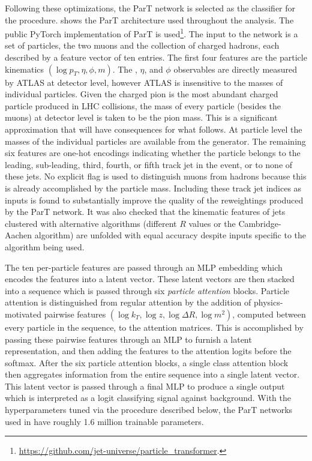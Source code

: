 Following these optimizations, the ParT network is selected as the classifier for the \Omnifold procedure.
 shows the ParT architecture used throughout the analysis.
The public PyTorch implementation of ParT is used\footnote{\url{https://github.com/jet-universe/particle_transformer}.}.
The input to the network is a set of particles, the two muons and the collection of charged hadrons, each described by a feature vector of ten entries.
The first four features are the particle kinematics $(\log p_T, \eta, \phi, m)$.
The \pt, $\eta$, and $\phi$ observables are directly measured by ATLAS at detector level, however ATLAS is insensitive to the masses of individual particles.
Given the charged pion is the most abundant charged particle produced in LHC collisions, the mass of every particle (besides the muons) at detector level is taken to be the pion mass.
This is a significant approximation that will have consequences for what follows.
At particle level the masses of the individual particles are available from the generator.
The remaining six features are one-hot encodings indicating whether the particle belongs to the leading, sub-leading, third, fourth, or fifth \ak track jet in the event, or to none of these jets.
No explicit flag is used to distinguish muons from hadrons because this is already accomplished by the particle mass.
Including these track jet indices as inputs is found to substantially improve the quality of the reweightings produced by the ParT network.
It was also checked that the kinematic features of jets clustered with alternative algorithms (different $R$ values or the Cambridge-Aachen algorithm) are unfolded with equal accuracy despite inputs specific to the \ak algorithm being used.

The ten per-particle features are passed through an MLP embedding which encodes the features into a latent vector.
These latent vectors are then stacked into a sequence which is passed through six \textit{particle attention} blocks.
Particle attention is distinguished from regular attention by the addition of physics-motivated pairwise features $(\log k_T, \log z, \log \Delta R, \log m^2)$, computed between every particle in the sequence, to the attention matrices.
This is accomplished by passing these pairwise features through an MLP to furnish a latent representation, and then adding the features to the attention logits before the softmax.
After the six particle attention blocks, a single class attention block then aggregates information from the entire sequence into a single latent vector.
This latent vector is passed through a final MLP to produce a single output which is interpreted as a logit classifying signal against background.
With the hyperparameters tuned via the procedure described below, the ParT networks used in \Omnifold have roughly 1.6 million trainable parameters.

